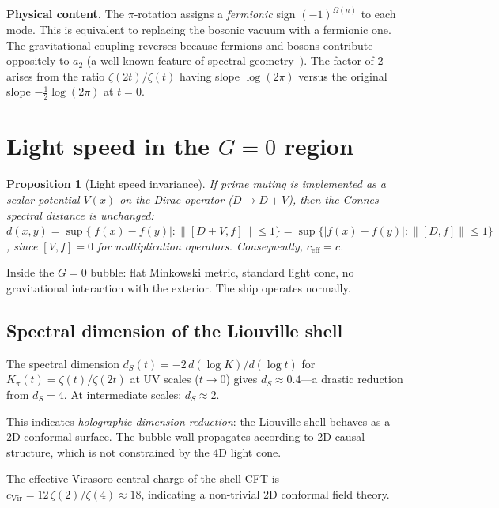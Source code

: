 \documentclass[aps,prd,twocolumn,superscriptaddress,nofootinbib]{revtex4-2}
\newtheorem{proposition}[theorem]{Proposition}
\begin{document}
\textbf{Physical content.}
The $\pi$-rotation assigns a \emph{fermionic} sign $(-1)^{\Omega(n)}$
to each mode.  This is equivalent to replacing the bosonic vacuum with
a fermionic one.  The gravitational coupling reverses because
fermions and bosons contribute oppositely to $a_2$
(a well-known feature of spectral geometry~\cite{Gilkey1995}).
The factor of 2 arises from the ratio $\zeta(2t)/\zeta(t)$
having slope $\log(2\pi)$ versus the original slope
$-\tfrac{1}{2}\log(2\pi)$ at $t = 0$.

\section{Light speed in the $G = 0$ region}
\label{sec:light}

\begin{proposition}[Light speed invariance]
If prime muting is implemented as a scalar potential
$V(x)$ on the Dirac operator ($D \to D + V$),
then the Connes spectral distance is unchanged:
$d(x,y) = \sup\{|f(x) - f(y)| : \|[D+V, f]\| \leq 1\}
= \sup\{|f(x) - f(y)| : \|[D, f]\| \leq 1\}$,
since $[V, f] = 0$ for multiplication operators.
Consequently, $c_{\mathrm{eff}} = c$.
\end{proposition}

Inside the $G = 0$ bubble:
flat Minkowski metric, standard light cone, no gravitational interaction
with the exterior.
The ship operates normally.

\subsection{Spectral dimension of the Liouville shell}

The spectral dimension
$d_S(t) = -2\,d(\log K)/d(\log t)$
for $K_\pi(t) = \zeta(t)/\zeta(2t)$ at UV scales
($t \to 0$) gives $d_S \approx 0.4$---a drastic reduction from
$d_S = 4$.
At intermediate scales: $d_S \approx 2$.

This indicates \emph{holographic dimension reduction}:
the Liouville shell behaves as a 2D conformal surface.
The bubble wall propagates according to 2D causal structure,
which is not constrained by the 4D light cone.

The effective Virasoro central charge of the shell CFT
is $c_{\mathrm{Vir}} = 12\,\zeta(2)/\zeta(4) \approx 18$,
indicating a non-trivial 2D conformal field theory.
\end{document}
